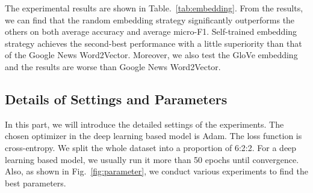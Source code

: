 The experimental results are shown in Table.~\ref{tab:embedding}. From the results, we can find that the random embedding strategy significantly outperforms the others on both average accuracy and average micro-F1. Self-trained embedding strategy achieves the second-best performance with a little superiority than that of the Google News Word2Vector. Moreover, we also test the GloVe embedding and the results are worse than Google News Word2Vector.

\begin{table}[htbp]
	\caption{Results of Different Embedding Strategies}
	\centering
	\label{tab:embedding}
\end{table}

\subsection{Details of Settings and Parameters}
In this part, we will introduce the detailed settings of the experiments. The chosen optimizer in the deep learning based model is Adam. The loss function is cross-entropy. We split the whole dataset into a proportion of 6:2:2. For a deep learning based model, we usually run it more than 50 epochs until convergence. Also, as shown in Fig.~\ref{fig:parameter}, we conduct various experiments to find the best parameters.

